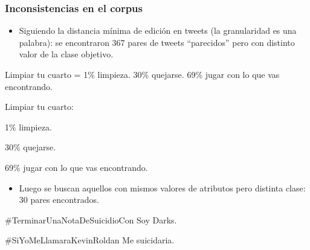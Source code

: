 \begin{frame}[allowframebreaks]
    \frametitle{Inconsistencias en el corpus}

    \begin{itemize}
        \item Siguiendo la distancia mínima de edición en tweets (la granularidad es una palabra): se encontraron 367 pares de tweets ``parecidos'' pero con distinto valor de la clase objetivo.
    \end{itemize}

    \begin{example}
        Limpiar tu cuarto = 1\% limpieza. 30\% quejarse. 69\% jugar con lo que vas encontrando.
    \end{example}

    \begin{example}
        Limpiar tu cuarto:

        1\% limpieza.

        30\% quejarse.

        69\% jugar con lo que vas encontrando.
    \end{example}


    \framebreak

    \begin{itemize}
        \item Luego se buscan aquellos con mismos valores de atributos pero distinta clase: 30 pares encontrados.
    \end{itemize}

    \begin{example}
        \#TerminarUnaNotaDeSuicidioCon Soy Darks.
    \end{example}

    \begin{example}
        \#SiYoMeLlamaraKevinRoldan Me suicidaria.
    \end{example}
\end{frame}

